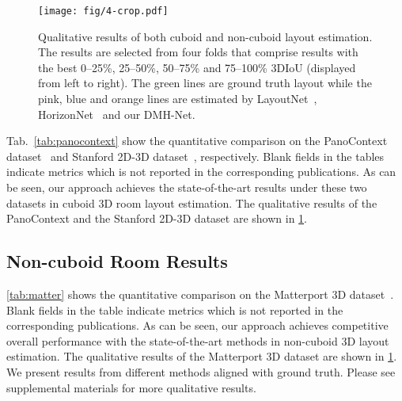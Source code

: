 \documentclass[runningheads]{llncs}
\begin{document}
\begin{figure}[!b]
	\centering
	\texttt{[image: fig/4-crop.pdf]}
	\caption{Qualitative results of both cuboid and non-cuboid layout estimation. The results are selected from four folds that comprise results with the best 0–25\%, 25–50\%, 50–75\% and 75–100\% 3DIoU (displayed from left to right). The green lines are ground truth layout while the pink, blue and orange lines are estimated by LayoutNet~\cite{zou2018layoutnet}, HorizonNet~\cite{sun2019horizonnet} and our DMH-Net.
    }
\label{fig:visual_result} 
\end{figure}

Tab.~\ref{tab:panocontext} show the quantitative comparison on the PanoContext dataset~\cite{zhang2014panocontext} and Stanford 2D-3D dataset~\cite{armeni2017joint,zou2018layoutnet}, respectively. Blank fields in the tables indicate metrics which is not reported in the corresponding publications.
As can be seen, our approach achieves the state-of-the-art results under these two datasets in cuboid 3D room layout estimation. 
The qualitative results of the PanoContext and the Stanford 2D-3D dataset are shown in \cref{fig:visual_result}.


\subsection{Non-cuboid Room Results}\label{sec:non-cuboid_result}
\cref{tab:matter} shows the quantitative comparison on the Matterport 3D dataset~\cite{Matterport3D}. Blank fields in the table indicate metrics which is not reported in the corresponding publications.
As can be seen, our approach achieves competitive overall performance with the state-of-the-art methods in non-cuboid 3D layout estimation.
The qualitative results of the Matterport 3D dataset are shown in \cref{fig:visual_result}. We present results from different methods aligned with ground truth. Please see supplemental materials for more qualitative results.
\end{document}
